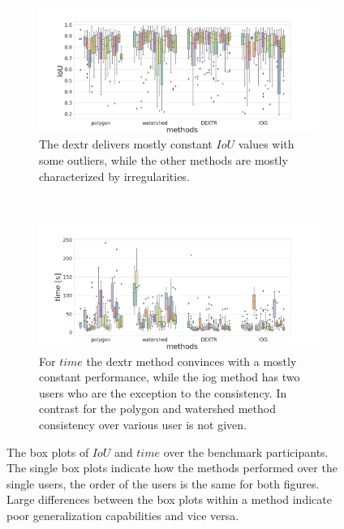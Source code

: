 \begin{figure} 
	\centering
	\begin{subfigure}[t]{1.0\textwidth}
		\centering
		\includegraphics[width=\textwidth]{figures/chap53_all_users_iou.png}
		\caption{
			The \gls{dextr} delivers mostly constant $ IoU $ values with some outliers, while the other methods are mostly characterized by irregularities.
		}\label{fig:ch5:sec3:all_benchmark_iou}
	\end{subfigure}
	\\
	\begin{subfigure}[t]{1.0\textwidth}
		\centering
		\includegraphics[width=\textwidth]{figures/chap53_all_users_time.png}
		\caption{
			For $ time $ the \gls{dextr} method convinces with a mostly constant performance, while the \gls{iog} method has two users who are the exception to the consistency.
			In contrast for the polygon and watershed method consistency over various user is not given.			
		} \label{fig:ch5:sec3:all_benchmark_time}
	\end{subfigure}
	\caption[Box plots of benchmark participants on $ IoU $ and $ time$.]{		
		The box plots of $ IoU $ and $ time $ over the \getNumberBenchmarkParticipants benchmark participants.
		The single box plots indicate how the methods performed over the single users, the order of the users is the same for both figures. 
		Large differences between the box plots within a method indicate poor generalization capabilities and vice versa.
	}\label{fig:ch5:sec3:all_benchmark}
\end{figure}


